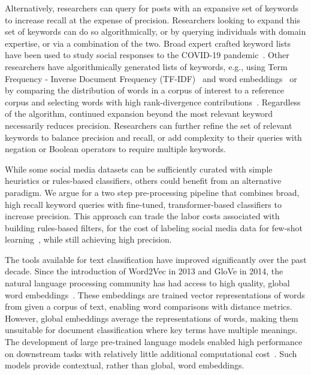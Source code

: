 Alternatively, researchers can query for posts with an expansive set of keywords
to increase recall at the expense of precision. 
Researchers looking to expand this set of keywords can do so algorithmically,
or by querying individuals with domain expertise, or via a combination of the two.
Broad expert crafted keyword lists have been used to study
social responses to the COVID-19 pandemic~\cite{shugars2021pandemics,chen2020tracking,green2020elusive,twitter_2020}.
Other researchers have algorithmically generated lists of keywords, e.g., using Term Frequency - Inverse Document Frequency (TF-IDF)~\cite{aizawa2003information} and word embeddings~\cite{marujo2015automatic} or
by comparing the distribution of words in a corpus of interest to a reference corpus
and selecting words with high rank-divergence contributions~\cite{dodds2020allotaxonometry,alshaabi2021world,minot2022distinguishing,stupinski2022quantifying}. 
Regardless of the algorithm, continued expansion beyond the most relevant keyword necessarily reduces precision. 
Researchers can further refine the set of relevant keywords to balance precision and recall,
or add complexity to their queries with negation or Boolean operators to require multiple keywords.

While some social media datasets can be sufficiently curated
with simple heuristics
or rules-based classifiers,
others could benefit from an alternative paradigm.
We argue for a two step pre-processing pipeline
that combines broad,
high recall keyword queries
with fine-tuned,
transformer-based classifiers
to increase precision.
This approach can trade the labor costs associated with building rules-based filters, 
for the cost of labeling social media data for few-shot learning~\cite{wang2020generalizing}, while still achieving high precision.

The tools available for text classification have improved significantly over the past decade.
Since the introduction of Word2Vec in 2013 and GloVe in 2014,
the natural language processing community has had access to high quality, global word embeddings~\cite{mikolov2013efficient,pennington2014glove}.
These embeddings are trained vector representations of words from given a corpus of text,
enabling word comparisons with distance metrics.
However, global embeddings average the representations of words,
making them unsuitable for document classification
where key terms have multiple meanings.
The development of large pre-trained language models
enabled high performance on downstream tasks with relatively little additional computational cost~\cite{devlin2018bert,liu2019roberta}. Such models provide contextual, rather than global, word embeddings. 


